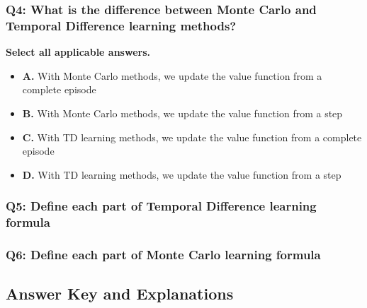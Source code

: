\documentclass[11pt,a4paper]{article}
\begin{document}

\subsubsection{Q4: What is the difference between Monte Carlo and Temporal Difference learning methods?}\label{q4-what-is-the-difference-between-monte-carlo-and-temporal-difference-learning-methods}

\textbf{Select all applicable answers.}

\begin{itemize}
\tightlist
\item
  \textbf{A.} With Monte Carlo methods, we update the value function from a complete episode
\item
  \textbf{B.} With Monte Carlo methods, we update the value function from a step
\item
  \textbf{C.} With TD learning methods, we update the value function from a complete episode
\item
  \textbf{D.} With TD learning methods, we update the value function from a step
\end{itemize}

\subsubsection{Q5: Define each part of Temporal Difference learning formula}\label{q5-define-each-part-of-temporal-difference-learning-formula}


\subsubsection{Q6: Define each part of Monte Carlo learning formula}\label{q6-define-each-part-of-monte-carlo-learning-formula}


\subsection{Answer Key and Explanations}\label{answer-key-and-explanations}
\end{document}
